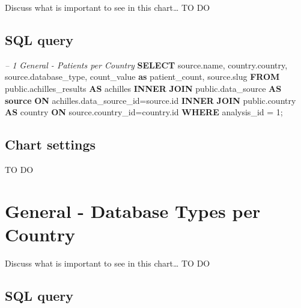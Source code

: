 \documentclass[]{book}
\newenvironment{Shaded}{\begin{snugshade}}{\end{snugshade}}
\newcommand{\KeywordTok}[1]{\textcolor[rgb]{0.13,0.29,0.53}{\textbf{#1}}}
\newcommand{\DecValTok}[1]{\textcolor[rgb]{0.00,0.00,0.81}{#1}}
\newcommand{\CommentTok}[1]{\textcolor[rgb]{0.56,0.35,0.01}{\textit{#1}}}
\newcommand{\NormalTok}[1]{#1}
\begin{document}
Discuss what is important to see in this chart\ldots{} TO DO

\subsection{SQL query}\label{sql-query-4}

\begin{Shaded}
\begin{Highlighting}[]
\CommentTok{-- 1    General - Patients per Country}
\KeywordTok{SELECT}\NormalTok{ source.name,}
\NormalTok{       country.country,}
\NormalTok{       source.database_type,}
\NormalTok{       count_value }\KeywordTok{as}\NormalTok{ patient_count,}
\NormalTok{       source.slug}
\KeywordTok{FROM}\NormalTok{ public.achilles_results }\KeywordTok{AS}\NormalTok{ achilles }\KeywordTok{INNER} \KeywordTok{JOIN} 
\NormalTok{  public.data_source }\KeywordTok{AS} \KeywordTok{source} \KeywordTok{ON}\NormalTok{ achilles.data_source_id=source.id}
  \KeywordTok{INNER} \KeywordTok{JOIN}\NormalTok{ public.country }\KeywordTok{AS}\NormalTok{ country }\KeywordTok{ON} 
\NormalTok{  source.country_id=country.id}
\KeywordTok{WHERE}\NormalTok{ analysis_id = }\DecValTok{1}\NormalTok{;}
\end{Highlighting}
\end{Shaded}

\subsection{Chart settings}\label{chart-settings-5}

TO DO

\section{General - Database Types per
Country}\label{general---database-types-per-country}

Discuss what is important to see in this chart\ldots{} TO DO

\subsection{SQL query}\label{sql-query-5}
\end{document}
